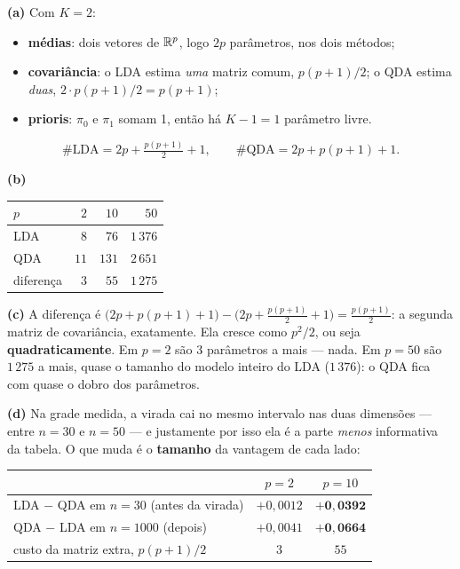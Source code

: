\documentclass[11pt,a4paper]{article}
\begin{document}
\begin{solucao}
\textbf{(a)} Com $K=2$:
\begin{itemize}[leftmargin=1.4cm]
  \item \textbf{médias}: dois vetores de $\mathbb{R}^p$, logo $2p$ parâmetros, nos dois
        métodos;
  \item \textbf{covariância}: o LDA estima \emph{uma} matriz comum,
        $p(p+1)/2$; o QDA estima \emph{duas}, $2\cdot p(p+1)/2 = p(p+1)$;
  \item \textbf{prioris}: $\pi_0$ e $\pi_1$ somam 1, então há $K-1=1$ parâmetro
        livre.
\end{itemize}
\[
  \#\text{LDA} = 2p + \tfrac{p(p+1)}{2} + 1,
  \qquad
  \#\text{QDA} = 2p + p(p+1) + 1 .
\]

\smallskip
\textbf{(b)}
\begin{center}\small
\renewcommand{\arraystretch}{1.3}
\begin{tabular}{@{}lrrr@{}}
\toprule
$p$ & $2$ & $10$ & $50$ \\
\midrule
LDA & $8$  & $76$  & $1\,376$ \\
QDA & $11$ & $131$ & $2\,651$ \\
\midrule
diferença & $3$ & $55$ & $1\,275$ \\
\bottomrule
\end{tabular}
\end{center}

\smallskip
\textbf{(c)} A diferença é
$\big(2p+p(p+1)+1\big)-\big(2p+\tfrac{p(p+1)}{2}+1\big)=\tfrac{p(p+1)}{2}$: a
segunda matriz de covariância, exatamente. Ela cresce como $p^2/2$, ou seja
\textbf{quadraticamente}. Em $p=2$ são 3 parâmetros a mais --- nada. Em $p=50$ são
$1\,275$ a mais, quase o tamanho do modelo inteiro do LDA ($1\,376$): o QDA fica
com quase o dobro dos parâmetros.

\smallskip
\textbf{(d)} Na grade medida, a virada cai no mesmo intervalo nas duas dimensões
--- entre $n=30$ e $n=50$ --- e justamente por isso ela é a parte \emph{menos}
informativa da tabela. O que muda é o \textbf{tamanho} da vantagem de cada lado:

\begin{center}\small
\renewcommand{\arraystretch}{1.2}
\begin{tabular}{@{}lcc@{}}
\toprule
                                    & $p=2$ & $p=10$ \\
\midrule
LDA $-$ QDA em $n=30$ (antes da virada)   & $+0{,}0012$ & $\mathbf{+0{,}0392}$ \\
QDA $-$ LDA em $n=1000$ (depois)          & $+0{,}0041$ & $\mathbf{+0{,}0664}$ \\
custo da matriz extra, $p(p+1)/2$         & $3$ & $55$ \\
\bottomrule
\end{tabular}
\end{center}


\end{solucao}
\end{document}

